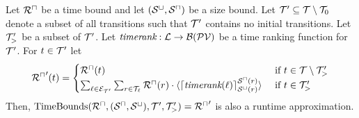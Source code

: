 \begin{theorem}[TimeBounds]
  Let ${\mathcal{R}^\sqcap}$ be a time bound and let ${({\mathcal{S}^\sqcup}, {\mathcal{S}^\sqcap})}$ be a size bound.
  Let $\mathcal{T}' \subseteq \mathcal{T} \setminus \mathcal{T}_0$ denote a subset of all transitions such that $\mathcal{T}'$ contains no initial transitions.
  Let $\mathcal{T}'_>$ be a subset of $\mathcal{T}'$.
  Let $\emph{timerank}: \mathcal{L} \rightarrow \mathcal{B}(\mathcal{PV})$ be a time ranking function for $\mathcal{T}'$.
  For $t \in \mathcal{T}'$ let
  \[ {\mathcal{R}^\sqcap}'(t) = 
  \begin{cases}
    {\mathcal{R}^\sqcap}(t) & \text{ if } t \in \mathcal{T} \setminus \mathcal{T}'_> \\
    \sum_{\ell \in \mathcal{E}_{\mathcal{T}'}} \sum_{r \in \mathcal{T}_\ell} {\mathcal{R}^\sqcap}(r) \cdot \langle\lceil \emph{timerank}(\ell) \rceil^{{\mathcal{S}^\sqcap}(r)}_{{\mathcal{S}^\sqcup}(r)}\rangle & \text{ if } t \in \mathcal{T}'_>
  \end{cases}
  \]
  Then, $\text{TimeBounds}({\mathcal{R}^\sqcap}, ({\mathcal{S}^\sqcap}, {\mathcal{S}^\sqcup}), \mathcal{T}', \mathcal{T}'_>) = {\mathcal{R}^\sqcap}'$ is also a runtime approximation.
\end{theorem}
